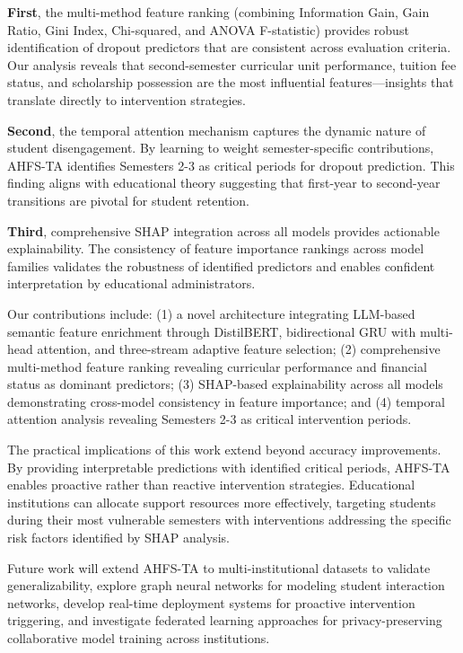 \documentclass[journal]{IEEEtran}
\begin{document}
\textbf{First}, the multi-method feature ranking (combining Information Gain, Gain Ratio, Gini Index, Chi-squared, and ANOVA F-statistic) provides robust identification of dropout predictors that are consistent across evaluation criteria. Our analysis reveals that second-semester curricular unit performance, tuition fee status, and scholarship possession are the most influential features---insights that translate directly to intervention strategies.

\textbf{Second}, the temporal attention mechanism captures the dynamic nature of student disengagement. By learning to weight semester-specific contributions, AHFS-TA identifies Semesters 2-3 as critical periods for dropout prediction. This finding aligns with educational theory suggesting that first-year to second-year transitions are pivotal for student retention.

\textbf{Third}, comprehensive SHAP integration across all models provides actionable explainability. The consistency of feature importance rankings across model families validates the robustness of identified predictors and enables confident interpretation by educational administrators.

Our contributions include: (1) a novel architecture integrating LLM-based semantic feature enrichment through DistilBERT, bidirectional GRU with multi-head attention, and three-stream adaptive feature selection; (2) comprehensive multi-method feature ranking revealing curricular performance and financial status as dominant predictors; (3) SHAP-based explainability across all models demonstrating cross-model consistency in feature importance; and (4) temporal attention analysis revealing Semesters 2-3 as critical intervention periods.

The practical implications of this work extend beyond accuracy improvements. By providing interpretable predictions with identified critical periods, AHFS-TA enables proactive rather than reactive intervention strategies. Educational institutions can allocate support resources more effectively, targeting students during their most vulnerable semesters with interventions addressing the specific risk factors identified by SHAP analysis.

Future work will extend AHFS-TA to multi-institutional datasets to validate generalizability, explore graph neural networks for modeling student interaction networks, develop real-time deployment systems for proactive intervention triggering, and investigate federated learning approaches for privacy-preserving collaborative model training across institutions.





\end{document}
